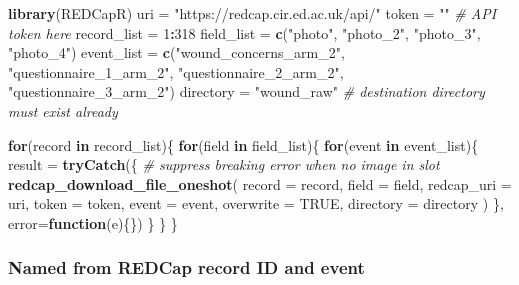 \documentclass[]{book}
\newenvironment{Shaded}{\begin{snugshade}}{\end{snugshade}}
\newcommand{\CommentTok}[1]{\textcolor[rgb]{0.56,0.35,0.01}{\textit{#1}}}
\newcommand{\ControlFlowTok}[1]{\textcolor[rgb]{0.13,0.29,0.53}{\textbf{#1}}}
\newcommand{\DataTypeTok}[1]{\textcolor[rgb]{0.13,0.29,0.53}{#1}}
\newcommand{\DecValTok}[1]{\textcolor[rgb]{0.00,0.00,0.81}{#1}}
\newcommand{\KeywordTok}[1]{\textcolor[rgb]{0.13,0.29,0.53}{\textbf{#1}}}
\newcommand{\NormalTok}[1]{#1}
\newcommand{\OperatorTok}[1]{\textcolor[rgb]{0.81,0.36,0.00}{\textbf{#1}}}
\newcommand{\OtherTok}[1]{\textcolor[rgb]{0.56,0.35,0.01}{#1}}
\newcommand{\StringTok}[1]{\textcolor[rgb]{0.31,0.60,0.02}{#1}}
\begin{document}
\begin{Shaded}
\begin{Highlighting}[]
\KeywordTok{library}\NormalTok{(REDCapR)}
\NormalTok{uri =}\StringTok{ "https://redcap.cir.ed.ac.uk/api/"}
\NormalTok{token =}\StringTok{ ""} \CommentTok{# API token here}
\NormalTok{record_list =}\StringTok{ }\DecValTok{1}\OperatorTok{:}\DecValTok{318}
\NormalTok{field_list =}\StringTok{ }\KeywordTok{c}\NormalTok{(}\StringTok{"photo"}\NormalTok{, }\StringTok{"photo_2"}\NormalTok{, }\StringTok{"photo_3"}\NormalTok{, }\StringTok{"photo_4"}\NormalTok{)}
\NormalTok{event_list =}\StringTok{ }\KeywordTok{c}\NormalTok{(}\StringTok{"wound_concerns_arm_2"}\NormalTok{, }\StringTok{"questionnaire_1_arm_2"}\NormalTok{,}
               \StringTok{"questionnaire_2_arm_2"}\NormalTok{, }\StringTok{"questionnaire_3_arm_2"}\NormalTok{)}
\NormalTok{directory =}\StringTok{ "wound_raw"} \CommentTok{# destination directory must exist already}


\ControlFlowTok{for}\NormalTok{(record }\ControlFlowTok{in}\NormalTok{ record_list)\{}
  \ControlFlowTok{for}\NormalTok{(field }\ControlFlowTok{in}\NormalTok{ field_list)\{}
    \ControlFlowTok{for}\NormalTok{(event }\ControlFlowTok{in}\NormalTok{ event_list)\{}
\NormalTok{      result =}\StringTok{ }
\StringTok{        }\KeywordTok{tryCatch}\NormalTok{(\{      }\CommentTok{# suppress breaking error when no image in slot}
          \KeywordTok{redcap_download_file_oneshot}\NormalTok{(}
            \DataTypeTok{record        =}\NormalTok{ record,}
            \DataTypeTok{field         =}\NormalTok{ field,}
            \DataTypeTok{redcap_uri    =}\NormalTok{ uri,}
            \DataTypeTok{token         =}\NormalTok{ token,}
            \DataTypeTok{event         =}\NormalTok{ event,}
            \DataTypeTok{overwrite     =} \OtherTok{TRUE}\NormalTok{,}
            \DataTypeTok{directory     =}\NormalTok{ directory}
\NormalTok{          )}
\NormalTok{        \}, }\DataTypeTok{error=}\ControlFlowTok{function}\NormalTok{(e)\{\})}
\NormalTok{    \}}
\NormalTok{  \}}
\NormalTok{\}}
\end{Highlighting}
\end{Shaded}

\hypertarget{named-from-redcap-record-id-and-event}{%
\subsubsection{Named from REDCap record ID and event}\label{named-from-redcap-record-id-and-event}}
\end{document}

